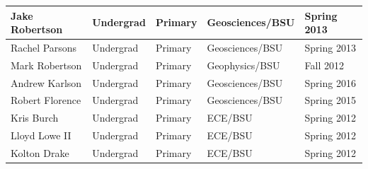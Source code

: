 \documentclass[11pt]{article}
\begin{document}
\begin{table}[!htbp]
\begin{tabular}{|l|l|l|l|l|}
Jake Robertson & Undergrad & Primary & Geosciences/BSU & Spring 2013 \\ \hline
Rachel Parsons & Undergrad & Primary & Geosciences/BSU & Spring 2013 \\ \hline
Mark Robertson & Undergrad & Primary & Geophysics/BSU & Fall 2012 \\ \hline
Andrew Karlson & Undergrad & Primary & Geosciences/BSU & Spring 2016 \\ \hline
Robert Florence & Undergrad & Primary & Geosciences/BSU & Spring 2015 \\ \hline
Kris Burch & Undergrad & Primary & ECE/BSU & Spring 2012 \\ \hline
Lloyd Lowe II & Undergrad & Primary & ECE/BSU & Spring 2012 \\ \hline
Kolton Drake & Undergrad & Primary & ECE/BSU & Spring 2012 \\ \hline
\end{tabular}
\end{table}

\pagebreak
\end{document}
